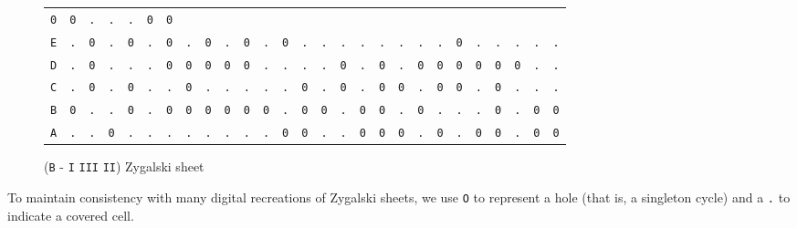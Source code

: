 \begin{figure}[H]
\begin{center}
{\begin{tabular}{c|cccccccccccccccccccccccccc}
        \texttt{0} & \texttt{0} & \texttt{.} & \texttt{.} &
        \texttt{.} & \texttt{0} & \texttt{0}                             \\
        \texttt{E} & \texttt{.} & \texttt{0} & \texttt{.} &
        \texttt{0} & \texttt{.} & \texttt{0} & \texttt{.} &
        \texttt{0} & \texttt{.} & \texttt{0} & \texttt{.} &
        \texttt{0} & \texttt{.} & \texttt{.} & \texttt{.} &
        \texttt{.} & \texttt{.} & \texttt{.} & \texttt{.} &
        \texttt{.} & \texttt{0} & \texttt{.} & \texttt{.} &
        \texttt{.} & \texttt{.} & \texttt{.}                             \\
        \texttt{D} & \texttt{.} & \texttt{0} & \texttt{.} &
        \texttt{.} & \texttt{.} & \texttt{0} & \texttt{0} &
        \texttt{0} & \texttt{0} & \texttt{0} & \texttt{.} &
        \texttt{.} & \texttt{.} & \texttt{.} & \texttt{0} &
        \texttt{.} & \texttt{0} & \texttt{.} & \texttt{0} &
        \texttt{0} & \texttt{0} & \texttt{0} & \texttt{0} &
        \texttt{0} & \texttt{.} & \texttt{.}                             \\
        \texttt{C} & \texttt{.} & \texttt{0} & \texttt{.} &
        \texttt{0} & \texttt{.} & \texttt{.} & \texttt{0} &
        \texttt{.} & \texttt{.} & \texttt{.} & \texttt{.} &
        \texttt{.} & \texttt{0} & \texttt{.} & \texttt{0} &
        \texttt{.} & \texttt{0} & \texttt{0} & \texttt{.} &
        \texttt{0} & \texttt{0} & \texttt{.} & \texttt{0} &
        \texttt{.} & \texttt{.} & \texttt{.}                             \\
        \texttt{B} & \texttt{0} & \texttt{.} & \texttt{.} &
        \texttt{0} & \texttt{.} & \texttt{0} & \texttt{0} &
        \texttt{0} & \texttt{0} & \texttt{0} & \texttt{0} &
        \texttt{.} & \texttt{0} & \texttt{0} & \texttt{.} &
        \texttt{0} & \texttt{0} & \texttt{.} & \texttt{0} &
        \texttt{.} & \texttt{.} & \texttt{.} & \texttt{0} &
        \texttt{.} & \texttt{0} & \texttt{0}                             \\
        \texttt{A} & \texttt{.} & \texttt{.} & \texttt{0} &
        \texttt{.} & \texttt{.} & \texttt{.} & \texttt{.} &
        \texttt{.} & \texttt{.} & \texttt{.} & \texttt{.} &
        \texttt{0} & \texttt{0} & \texttt{.} & \texttt{.} &
        \texttt{0} & \texttt{0} & \texttt{0} & \texttt{.} &
        \texttt{0} & \texttt{.} & \texttt{0} & \texttt{0} &
        \texttt{.} & \texttt{0} & \texttt{0}                             \\
    \end{tabular}}
  \end{center}
  \caption{(\texttt{B} - \texttt{I} \texttt{III} \texttt{II}) Zygalski sheet}
  \label{fig:zygalski_sheet}
\end{figure}
\noindent To maintain consistency with many digital recreations of
Zygalski sheets, we use \texttt{O} to represent a hole (that is, a
singleton cycle) and a \texttt{.} to indicate a covered cell.
